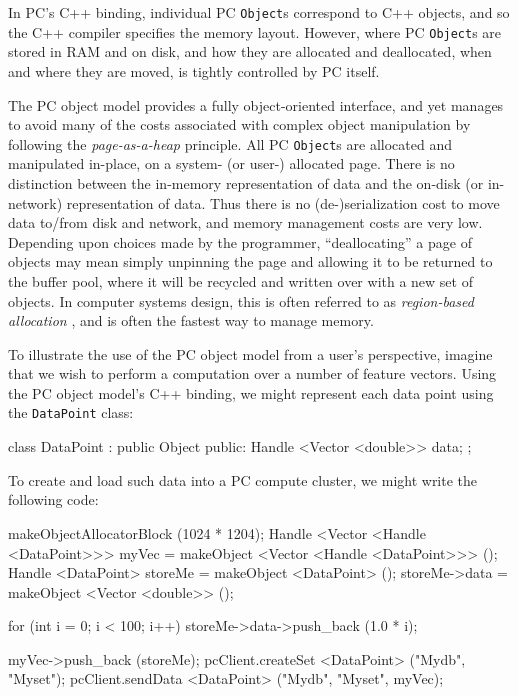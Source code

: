 In PC's C++ binding, individual PC \texttt{Object}s correspond to C++ objects, and so the C++ compiler specifies the memory layout.
However, where PC \texttt{Object}s are stored in RAM and on disk, and how they are allocated and deallocated, when and where they are moved, is
tightly controlled by PC itself.

The PC object model provides a fully object-oriented interface, and yet manages to avoid many of the costs associated with complex object manipulation
by following the \emph{page-as-a-heap} principle.  
All PC \texttt{Object}s are allocated and manipulated in-place, on a system-
(or user-) allocated page.  There is
no distinction between the in-memory representation of data and the on-disk (or in-network) representation of
data. Thus there is no (de-)serialization cost to move data to/from disk and network, and memory management costs are very low. Depending upon choices made by the
programmer, ``deallocating'' a page of objects
may mean simply unpinning the page and allowing it to be returned to the buffer pool, where it will be recycled and written over with a new set of objects.  
In computer systems design, this is often referred to as
\emph{region-based allocation} \cite{tofte1997region,
  grossman2002region}, and is often the fastest way to manage
memory. 

To illustrate the use of the PC object model from a user's perspective,
imagine that we wish to perform a computation over a number of feature vectors.  
Using the PC object model's C++ binding, we might represent each data point using the 
\texttt{DataPoint} class:

\begin{codesmall}
class DataPoint : public Object {
public:
	Handle <Vector <double>> data;
};
\end{codesmall}

\noindent
To create and load such data into a PC compute cluster, we might write the following code:

\begin{codesmall}
makeObjectAllocatorBlock (1024 * 1204);
Handle <Vector <Handle <DataPoint>>> myVec = 
     makeObject <Vector <Handle <DataPoint>>> ();
Handle <DataPoint> storeMe = makeObject <DataPoint> ();
storeMe->data = makeObject <Vector <double>> ();

for (int i = 0; i < 100; i++) 
     storeMe->data->push_back (1.0 * i);

myVec->push_back (storeMe);
pcClient.createSet <DataPoint> ("Mydb", "Myset");
pcClient.sendData <DataPoint> ("Mydb", "Myset", myVec);
\end{codesmall}

